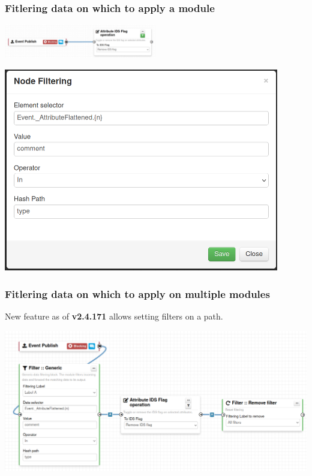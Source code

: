\begin{frame}
    \frametitle{Fitlering data on which to apply a module}
    \begin{center}
        \includegraphics[width=0.5\textwidth]{pictures/remove-ids-3.png}
    \end{center}
    \begin{center}
        \includegraphics[width=0.9\textwidth]{pictures/remove-ids-2.png}
    \end{center}
\end{frame}

\begin{frame}
    \frametitle{Fitlering data on which to apply on multiple modules}
    New feature as of \textbf{v2.4.171} allows setting filters on a path.
    \begin{center}
        \includegraphics[width=1.0\textwidth]{pictures/remove-ids-generic.png}
    \end{center}
\end{frame}

